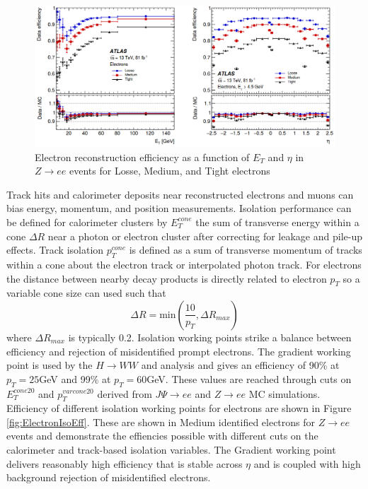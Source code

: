 \begin{figure}[!h]
        \centering
    \includegraphics[width=.75\textwidth]{Pictures/ElectroEff.png}
    \caption{ Electron reconstruction efficiency as a function of $E_T$ and $\eta$ in $Z\rightarrow ee$ events for Losse, Medium, and Tight electrons \cite{ElectronPhotonPerformance}}
    \label{fig:ElectroReco}
\end{figure}

Track hits and calorimeter deposits near reconstructed electrons and muons can bias energy, momentum, and position measurements. Isolation performance can be defined for calorimeter clusters by $E_T^{cone}$  the sum of transverse energy within a cone $\Delta R$ near a photon or electron cluster after correcting for leakage and pile-up effects. Track isolation $p_T^{cone}$ is defined as a sum of transverse momentum of tracks within a cone about the electron track or interpolated photon track. For electrons the distance between nearby decay products is directly related to electron $p_T$ so a variable cone size can used such that 
\begin{equation}
\Delta R = \text{min}(\frac{10}{p_T},\Delta R_{max})
\end{equation}
where $\Delta R_{max}$ is typically 0.2. Isolation working points strike a balance between efficiency and rejection of misidentified prompt electrons. The gradient working point is used by the $H\rightarrow WW$ and analysis and gives an efficiency of 90\% at $p_T = 25$GeV and 99\% at $p_T = 60$GeV. These values are reached through cuts on $E_T^{cone20}$ and $p_T^{varcone20}$ derived from $J\Psi\rightarrow ee$ and $Z\rightarrow ee$ MC simulations. Efficiency of different isolation working points for electrons are shown in Figure \ref{fig:ElectronIsoEff}. These are shown in Medium identified electrons for $Z\rightarrow ee$ events and demonstrate the effiencies possible with different cuts on the calorimeter and track-based isolation variables. The Gradient working point delivers reasonably high efficiency that is stable across $\eta$ and is coupled with high background rejection of misidentified electrons.  

